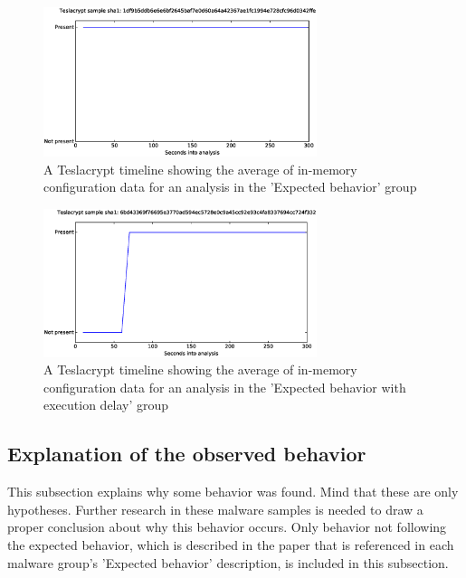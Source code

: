 \documentclass[conference]{IEEEtran}
\begin{document}
\begin{figure}[!h]
    \includegraphics[width=8cm,scale=0.5]{images/teslacrypt/teslacrypt-timelines-eps/Teslacrypt-1df9b5ddb6e6e6bf2645baf7e0d60a64a42367ae1fc1994e728cfc96d0342ffe.eps}
    \caption{A Teslacrypt timeline showing the average of in-memory configuration data for an analysis in the 'Expected behavior' group}
    \label{fig:teslacrypt-expected}
\end{figure}
\begin{figure}[!h]
    \includegraphics[width=8cm,scale=0.5]{images/teslacrypt/teslacrypt-timelines-eps/Teslacrypt-6bd43369f76695e3770ad594ec5728e0c9a45cc92e93c4fa8337694cc724f332.eps}
    \caption{A Teslacrypt timeline showing the average of in-memory configuration data for an analysis in the 'Expected behavior with execution delay' group}
    \label{fig:teslacrypt-expected-delay}
\end{figure}

\newpage
\subsection{Explanation of the observed behavior}
This subsection explains why some behavior was found. Mind that these are only hypotheses. Further research in these malware samples is needed to draw a proper conclusion about why this behavior occurs. Only behavior not following the expected behavior, which is described in the paper that is referenced in each malware group's 'Expected behavior' description, is included in this subsection.\\
\end{document}
